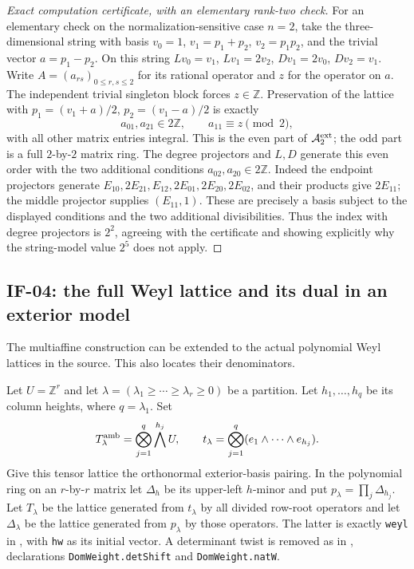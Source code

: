 \documentclass[11pt,a4paper]{article}
\theoremstyle{definition}
\theoremstyle{remark}
\begin{document}
\begin{proof}[Exact computation certificate, with an elementary rank-two check]
For an elementary check on the normalization-sensitive case $n=2$, take
the three-dimensional string with basis
$v_0=1$, $v_1=p_1+p_2$, $v_2=p_1p_2$, and the trivial vector
$a=p_1-p_2$. On this string
$Lv_0=v_1$, $Lv_1=2v_2$, $Dv_1=2v_0$, $Dv_2=v_1$.
Write $A=(a_{rs})_{0\leq r,s\leq2}$ for its rational operator and
$z$ for the operator on $a$. The independent trivial singleton
block forces $z\in\mathbb Z$. Preservation of the lattice with
$p_1=(v_1+a)/2$, $p_2=(v_1-a)/2$ is exactly
\[
 a_{01},a_{21}\in2\mathbb Z,\qquad
 a_{11}\equiv z\pmod2,
\]
with all other matrix entries integral. This is the even part of
$\mathcal A_2^{\rm ext}$; the odd part is a full $2$-by-$2$ matrix ring.
The degree projectors and $L,D$ generate this even order with the two
additional conditions $a_{02},a_{20}\in2\mathbb Z$. Indeed the endpoint
projectors generate
$E_{10},2E_{21},E_{12},2E_{01},2E_{20},2E_{02}$,
and their products give $2E_{11}$; the middle projector supplies
$(E_{11},1)$. These are precisely a basis subject to the displayed
conditions and the two additional divisibilities. Thus the index with
degree projectors is $2^2$, agreeing with the certificate and showing
explicitly why the string-model value $2^5$ does not apply.
\end{proof}

\subsection{IF-04: the full Weyl lattice and its dual in an exterior model}
The multiaffine construction can be extended to the actual polynomial
Weyl lattices in the source. This also locates their denominators.

Let $U=\mathbb Z^r$ and let $\lambda=(\lambda_1\geq\cdots\geq
\lambda_r\geq0)$ be a partition. Let $h_1,\ldots,h_q$ be its column
heights, where $q=\lambda_1$. Set
\[
 T^{\rm amb}_\lambda=\bigotimes_{j=1}^q\bigwedge^{h_j}U,
 \qquad t_\lambda=\bigotimes_{j=1}^q(e_1\wedge\cdots\wedge e_{h_j}).
\]
Give this tensor lattice the orthonormal exterior-basis pairing. In the
polynomial ring on an $r$-by-$r$ matrix let $\Delta_h$ be its upper-left
$h$-minor and put $p_\lambda=\prod_j\Delta_{h_j}$.
Let $T_\lambda$ be the lattice generated from $t_\lambda$ by all divided
row-root operators and let $\Delta_\lambda$ be the lattice generated
from $p_\lambda$ by those operators. The latter is exactly
\texttt{weyl} in ,
with \texttt{hw} as its initial vector. A determinant twist is removed
as in , declarations
\texttt{DomWeight.detShift} and \texttt{DomWeight.natW}.
\end{document}
